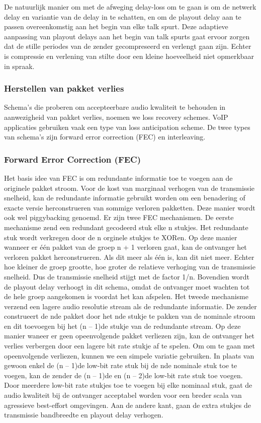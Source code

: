 
De natuurlijk manier om met de afweging delay-loss om te gaan is om de netwerk delay en variantie van de delay in te schatten, en om de playout delay aan te passen overeenkomstig aan het begin van elke talk spurt. Deze adaptieve aanpassing van playout delays aan het begin van talk spurts gaat ervoor zorgen dat de stille periodes van de zender gecompreseerd en verlengt gaan zijn. Echter is compressie en verlening van stilte door een kleine hoeveelheid niet opmerkbaar in spraak.

\subsubsection{Herstellen van pakket verlies}

Schema’s die proberen om accepteerbare audio kwaliteit te behouden in aanwezigheid van pakket verlies, noemen we loss recovery schemes. VoIP applicaties gebruiken vaak een type van loss anticipation scheme. De twee types van schema’s zijn forward error correction (FEC) en interleaving.

\subsubsection{Forward Error Correction (FEC)}

Het basis idee van FEC is om redundante informatie toe te voegen aan de originele pakket stroom. Voor de kost van marginaal verhogen van de transmissie snelheid, kan de redundante informatie gebruikt worden om een benadering of exacte versie herconstrueren van sommige verloren pakketten. Deze manier wordt ook wel piggybacking genoemd.
Er zijn twee FEC mechanismen. De eerste mechanisme zend een redundant gecodeerd stuk elke n stukjes. Het redundante stuk wordt verkregen door de n orginele stukjes te XORen. Op deze manier wanneer er één pakket van de groep n + 1 verloren gaat, kan de ontvanger het verloren pakket herconstrueren. Als dit meer als één is, kan dit niet meer. Echter hoe kleiner de groep grootte, hoe groter de relatieve verhoging van de transmissie snelheid. Dus de transmissie snelheid stijgt met de factor 1/n. Bovendien wordt de playout delay verhoogt in dit schema, omdat de ontvanger moet wachten tot de hele groep aangekomen is voordat het kan afspelen.
Het tweede mechanisme verzend een lagere audio resolutie stream als de redundante informatie. De zender construeert de nde pakket door het nde stukje te pakken van de nominale stroom en dit toevoegen bij het (n – 1)de stukje van de redundante stream. Op deze manier waneer er geen opeenvolgende pakket verliezen zijn, kan de ontvanger het verlies verbergen door een lagere bit rate stukje af te spelen. 
Om om te gaan met opeenvolgende verliezen, kunnen we een simpele variatie gebruiken. In plaats van gewoon enkel de (n – 1)de low-bit rate stuk bij de nde nominale stuk toe te voegen, kan de zender de (n – 1)de en (n – 2)de low-bit rate stuk toe voegen. Door meerdere low-bit rate stukjes toe te voegen bij elke nominaal stuk, gaat de audio kwaliteit bij de ontvanger acceptabel worden voor een breder scala van agressieve best-effort omgevingen. Aan de andere kant, gaan de extra stukjes de transmissie bandbreedte en playout delay verhogen.

